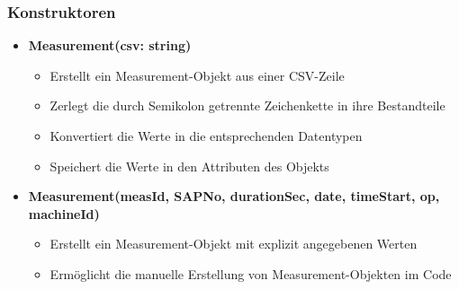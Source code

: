 \documentclass[a4paper,11pt]{article}
\begin{document}
\subsubsection{Konstruktoren}
\begin{itemize}
    \item \textbf{Measurement(csv: string)}
    \begin{itemize}
        \item Erstellt ein Measurement-Objekt aus einer CSV-Zeile
        \item Zerlegt die durch Semikolon getrennte Zeichenkette in ihre Bestandteile
        \item Konvertiert die Werte in die entsprechenden Datentypen
        \item Speichert die Werte in den Attributen des Objekts
    \end{itemize}
    
    \item \textbf{Measurement(measId, SAPNo, durationSec, date, timeStart, op, machineId)}
    \begin{itemize}
        \item Erstellt ein Measurement-Objekt mit explizit angegebenen Werten
        \item Ermöglicht die manuelle Erstellung von Measurement-Objekten im Code
    \end{itemize}
\end{itemize}
\end{document}
